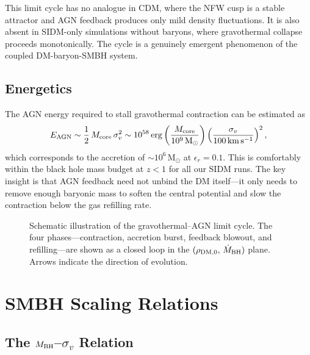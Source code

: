 \documentclass[fleqn,usenatbib]{mnras}
\newcommand{\kms}{\,\mathrm{km\,s^{-1}}}
\newcommand{\Msun}{\mathrm{M_\odot}}
\newcommand{\MBH}{M_{\rm BH}}
\newcommand{\vdisp}{\sigma_v}
\begin{document}
This limit cycle has no analogue in CDM, where the NFW cusp is a
stable attractor and AGN feedback produces only mild density
fluctuations.  It is also absent in SIDM-only simulations without
baryons, where gravothermal collapse proceeds monotonically.  The
cycle is a genuinely emergent phenomenon of the coupled
DM-baryon-SMBH system.

\subsection{Energetics}

The AGN energy required to stall gravothermal contraction can be
estimated as
\begin{equation}
  E_{\rm AGN} \sim \frac{1}{2}\,M_{\rm core}\,\vdisp^2
  \sim 10^{58}\,\mathrm{erg}
  \left(\frac{M_{\rm core}}{10^9\,\Msun}\right)
  \left(\frac{\vdisp}{100\kms}\right)^2,
  \label{eq:eagn}
\end{equation}
which corresponds to the accretion of $\sim 10^6\,\Msun$ at
$\epsilon_r = 0.1$.  This is comfortably within the black hole mass
budget at $z < 1$ for all our SIDM runs.  The key insight is that AGN
feedback need not unbind the DM itself---it only needs to remove
enough baryonic mass to soften the central potential and slow the
contraction below the gas refilling rate.

\begin{figure}
  \centering
  \caption{Schematic illustration of the gravothermal--AGN limit
    cycle.  The four phases---contraction, accretion burst, feedback
    blowout, and refilling---are shown as a closed loop in the
    $(\rho_{\rm DM,0},\,\dot{M}_{\rm BH})$ plane.  Arrows indicate
    the direction of evolution.}
  \label{fig:cycle}
\end{figure}


\section{SMBH Scaling Relations}
\label{sec:scaling}

\subsection{The $\MBH$--$\vdisp$ Relation}
\end{document}
